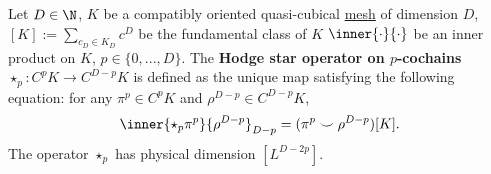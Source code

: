 \begin{definition}
  \label{cmc/mesh/quasi_cubical/hodge_star/concept-definition}
  Let
    $D \in \N$,
    $K$ be a compatibly oriented quasi-cubical
    \hyperref[cmc:mesh:definition]{mesh} of dimension $D$,
    $[K] := \sum_{c_D \in K_D} c^D$ be the fundamental class of $K$
    $\inner{\cdot}{\cdot}$ be an inner product on $K$,
    $p \in \{0, ..., D\}$.
  The \textbf{Hodge star operator on $p$-cochains}
  $\star_p \colon C^p K \to C^{D - p} K$
  is defined as the unique map satisfying the following equation:
  for any $\pi^p \in C^p K$ and $\rho^{D - p} \in C^{D - p} K$,
  \begin{equation}
    \inner{\star_p \pi^p}{\rho^{D - p}}_{D - p}
    = (\pi^p \smile \rho^{D - p})[K].
  \end{equation}
  The operator $\star_p$ has physical dimension $[L^{D - 2 p}]$.
\end{definition}

